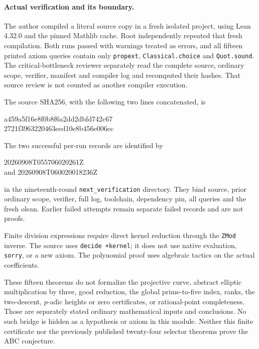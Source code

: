 \paragraph{Actual verification and its boundary.}
The author compiled a literal source copy in a fresh isolated
project, using Lean 4.32.0 and the pinned Mathlib cache. Root
independently repeated that fresh compilation. Both runs passed
with warnings treated as errors, and all fifteen printed axiom
queries contain only \texttt{propext},
\texttt{Classical.choice} and \texttt{Quot.sound}.
The critical-bottleneck reviewer separately read the complete
source, ordinary scope, verifier, manifest and compiler log and
recomputed their hashes. That source review is not counted as
another compiler execution.

The source SHA256, with the following two lines concatenated, is
\begin{center}
\small\ttfamily
a459a5f16e8f0b8f6a2dd2dbfd742c67\\
2721f3963220463eed10e8b456e006ec
\end{center}
The two successful per-run records are identified by
\begin{center}
\small\ttfamily
20260908T055706020261Z\\
\textrm{and }20260908T060020018236Z
\end{center}
in the nineteenth-round
\texttt{next\_verification} directory. They bind source, prior
ordinary scope, verifier, full log, toolchain, dependency pin,
all queries and the fresh olean. Earlier failed attempts remain
separate failed records and are not proofs.

Finite division expressions require direct kernel reduction through
the \texttt{ZMod} inverse. The source uses
\texttt{decide +kernel}; it does not use native evaluation,
\texttt{sorry}, or a new axiom. The polynomial proof uses algebraic
tactics on the actual coefficients.

These fifteen theorems do not formalize the projective curve,
abstract elliptic multiplication by three, good reduction, the
global prime-to-five index, ranks, the two-descent, $p$-adic heights
or zero certificates, or rational-point completeness. Those are
separately stated ordinary mathematical inputs and conclusions.
No such bridge is hidden as a hypothesis or axiom in this module.
Neither this finite certificate nor the previously published
twenty-four selector theorems prove the ABC conjecture.
